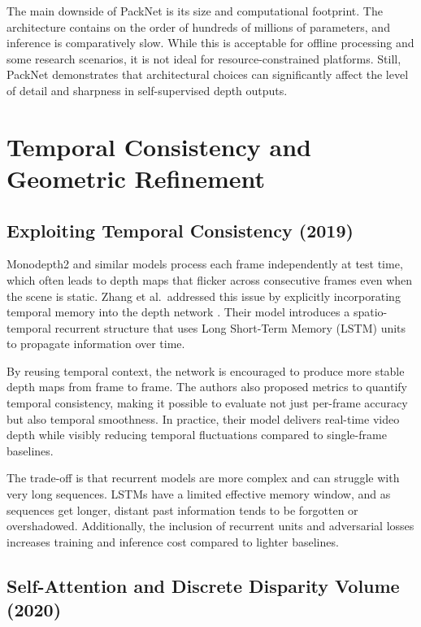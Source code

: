 \documentclass[10pt,twocolumn,letterpaper]{article}
\begin{document}
The main downside of PackNet is its size and computational footprint. The architecture contains on the order of hundreds of millions of parameters, and inference is comparatively slow. While this is acceptable for offline processing and some research scenarios, it is not ideal for resource-constrained platforms. Still, PackNet demonstrates that architectural choices can significantly affect the level of detail and sharpness in self-supervised depth outputs.

\section{Temporal Consistency and Geometric Refinement}
\label{sec:temporal}

\subsection{Exploiting Temporal Consistency (2019)}

Monodepth2 and similar models process each frame independently at test time, which often leads to depth maps that flicker across consecutive frames even when the scene is static. Zhang et al.\ addressed this issue by explicitly incorporating temporal memory into the depth network \cite{zhang2019exploiting}. Their model introduces a spatio-temporal recurrent structure that uses Long Short-Term Memory (LSTM) units to propagate information over time.

By reusing temporal context, the network is encouraged to produce more stable depth maps from frame to frame. The authors also proposed metrics to quantify temporal consistency, making it possible to evaluate not just per-frame accuracy but also temporal smoothness. In practice, their model delivers real-time video depth while visibly reducing temporal fluctuations compared to single-frame baselines.

The trade-off is that recurrent models are more complex and can struggle with very long sequences. LSTMs have a limited effective memory window, and as sequences get longer, distant past information tends to be forgotten or overshadowed. Additionally, the inclusion of recurrent units and adversarial losses increases training and inference cost compared to lighter baselines.

\subsection{Self-Attention and Discrete Disparity Volume (2020)}
\end{document}

